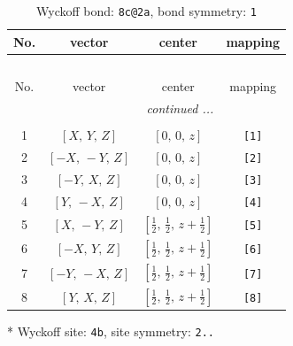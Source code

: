 \documentclass[fleqn,8pt]{jsarticle}
\begin{document}
\renewcommand{\arraystretch}{1.2}
\begin{longtable}{cccc}
\caption{Wyckoff bond: {\tt 8c@2a}, bond symmetry: {\tt 1}}
 \\
 \hline \hline
No. & vector & center & mapping \\ \hline \endfirsthead

\multicolumn{3}{l}{\tablename\ \thetable{}} \\
 \hline \hline
No. & vector & center & mapping \\ \hline \endhead

 \hline \hline
\multicolumn{3}{r}{\footnotesize\it continued ...} \\ \endfoot

 \hline \hline
\multicolumn{3}{r}{} \\ \endlastfoot

1 & $\left[ X,\, Y,\, Z \right]$ & $\left[ 0,\, 0,\, z \right]$ & {\tt [1]} \\ \hline
2 & $\left[ - X,\, - Y,\, Z \right]$ & $\left[ 0,\, 0,\, z \right]$ & {\tt [2]} \\ \hline
3 & $\left[ - Y,\, X,\, Z \right]$ & $\left[ 0,\, 0,\, z \right]$ & {\tt [3]} \\ \hline
4 & $\left[ Y,\, - X,\, Z \right]$ & $\left[ 0,\, 0,\, z \right]$ & {\tt [4]} \\ \hline
5 & $\left[ X,\, - Y,\, Z \right]$ & $\left[ \frac{1}{2},\, \frac{1}{2},\, z + \frac{1}{2} \right]$ & {\tt [5]} \\ \hline
6 & $\left[ - X,\, Y,\, Z \right]$ & $\left[ \frac{1}{2},\, \frac{1}{2},\, z + \frac{1}{2} \right]$ & {\tt [6]} \\ \hline
7 & $\left[ - Y,\, - X,\, Z \right]$ & $\left[ \frac{1}{2},\, \frac{1}{2},\, z + \frac{1}{2} \right]$ & {\tt [7]} \\ \hline
8 & $\left[ Y,\, X,\, Z \right]$ & $\left[ \frac{1}{2},\, \frac{1}{2},\, z + \frac{1}{2} \right]$ & {\tt [8]} \\
\end{longtable}
* Wyckoff site: {\tt 4b}, site symmetry: {\tt 2..}
\renewcommand{\arraystretch}{1.2}
\end{document}
